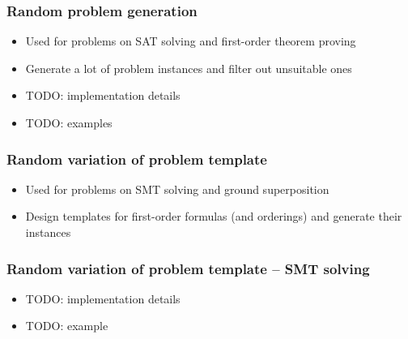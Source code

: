\documentclass[xcolor={table}]{beamer}
\begin{document}


\begin{frame}
\frametitle{Random problem generation}
\begin{itemize}
\item Used for problems on SAT solving and first-order theorem proving
\item Generate a lot of problem instances and filter out unsuitable ones
\item TODO: implementation details
\item TODO: examples
\end{itemize}
\end{frame}



\begin{frame}
  \frametitle{Random variation of problem template}
\begin{itemize}
\item Used for problems on SMT solving and ground superposition
\item Design templates for first-order formulas (and orderings)
  and generate their instances
\end{itemize}
\end{frame}



\begin{frame}
  \frametitle{Random variation of problem template -- SMT solving}
\begin{itemize}
\item TODO: implementation details
\item TODO: example
\end{itemize}
\end{frame}


\end{document}
